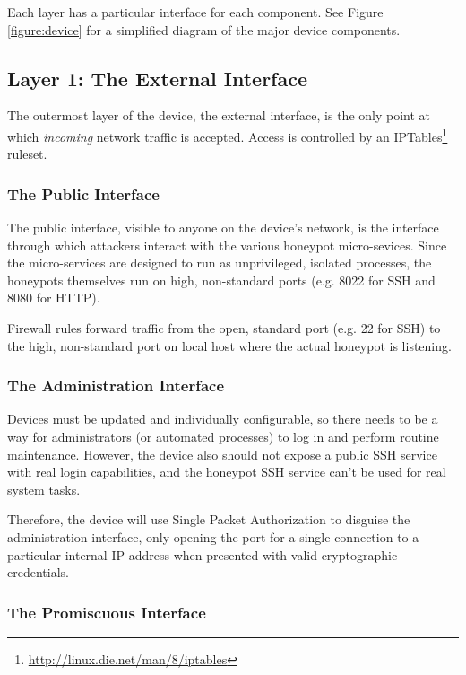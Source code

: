 Each layer has a particular interface for each component. See Figure
\ref{figure:device} for a simplified diagram of the major device components.

\subsection{Layer 1: The External Interface}

The outermost layer of the device, the external interface, is the only point at
which \textit{incoming} network traffic is accepted. Access is controlled
by an IPTables\footnote{\url{http://linux.die.net/man/8/iptables}}
ruleset.

\subsubsection{The Public Interface}

The public interface, visible to anyone on the device's network, is the
interface through which attackers interact with the various honeypot
micro-sevices. Since the micro-services are designed to run as unprivileged,
isolated processes, the honeypots themselves run on high, non-standard
ports (e.g. 8022 for SSH and 8080 for HTTP).

Firewall rules forward traffic from the open, standard port (e.g. 22 for SSH)
to the high, non-standard port on local host where the actual honeypot
is listening.

\subsubsection{The Administration Interface}

Devices must be updated and individually configurable, so there needs to be a
way for administrators (or automated processes) to log in and perform routine 
maintenance. However, the device also should not expose a public SSH service
with real login capabilities, and the honeypot SSH service can't be used for
real system tasks.

Therefore, the device will use Single Packet Authorization
to disguise the administration interface, only opening the port for a single
connection to a particular internal IP address when presented with valid
cryptographic credentials.

\subsubsection{The Promiscuous Interface}

